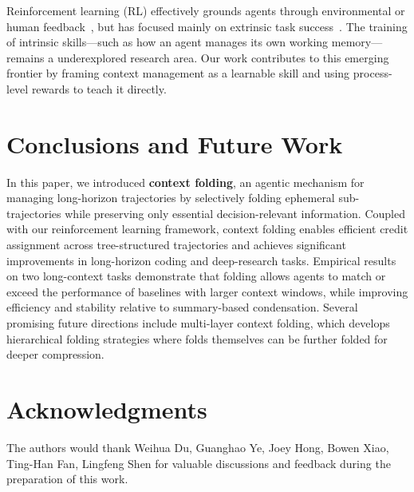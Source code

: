 Reinforcement learning (RL) effectively grounds agents through environmental or human feedback~\citep{Zhang2025TheLO,Qiao2025WebResearcherUU}, but has focused mainly on extrinsic task success~\citep{DeepSeekAI2025DeepSeekR1IR}. 
The training of intrinsic skills—such as how an agent manages its own working memory—remains a underexplored research area. Our work contributes to this emerging frontier by framing context management as a learnable skill and using process-level rewards to teach it directly.

\section{Conclusions and Future Work}
In this paper, we introduced \textbf{context folding}, an agentic mechanism for managing long-horizon trajectories by selectively folding ephemeral sub-trajectories while preserving only essential decision-relevant information. Coupled with our reinforcement learning framework, context folding enables efficient credit assignment across tree-structured trajectories and achieves significant improvements in long-horizon coding and deep-research tasks. Empirical results on two long-context tasks demonstrate that folding allows agents to match or exceed the performance of baselines with larger context windows, while improving efficiency and stability relative to summary-based condensation. 
Several promising future directions include multi-layer context folding, which develops hierarchical folding strategies where folds themselves can be further folded for deeper compression.


\section*{Acknowledgments}
The authors would thank Weihua Du, Guanghao Ye, Joey Hong, Bowen Xiao, Ting-Han Fan, Lingfeng Shen for valuable discussions and feedback during the preparation of this work.

